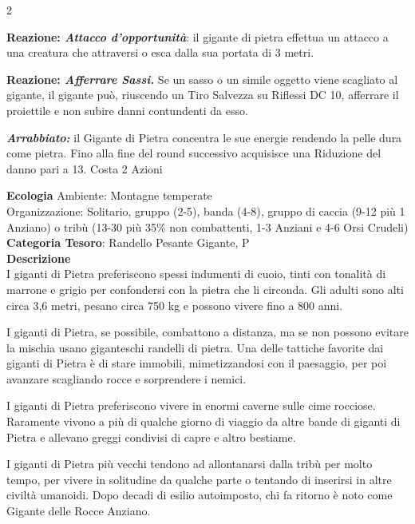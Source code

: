 \begin{multicols}{2}
{\textbf{Reazione: \emph{Attacco d'opportunità}}: il gigante di pietra effettua un attacco a una creatura che attraversi o esca dalla sua portata di 3 metri.

\textbf{Reazione: \emph{Afferrare Sassi.}} Se un sasso o un simile oggetto viene scagliato al gigante, il gigante può, riuscendo un Tiro Salvezza su Riflessi DC 10, afferrare il proiettile e non subire danni contundenti da esso.

\emph{\textbf{Arrabbiato:}} il Gigante di Pietra concentra le sue energie rendendo la pelle dura come pietra. Fino alla fine del round successivo acquisisce una Riduzione del danno pari a 13. Costa 2 Azioni

\textbf{Ecologia}
Ambiente: Montagne temperate\\
Organizzazione: Solitario, gruppo (2-5), banda (4-8), gruppo di caccia (9-12 più 1 Anziano) o tribù (13-30 più 35\% non combattenti, 1-3 Anziani e 4-6 Orsi Crudeli)\\
\textbf{Categoria Tesoro}: Randello Pesante Gigante, P\\
\textbf{Descrizione}\\
I giganti di Pietra preferiscono spessi indumenti di cuoio, tinti con tonalità di marrone e grigio per confondersi con la pietra che li circonda. Gli adulti sono alti circa 3,6 metri, pesano circa 750 kg e possono vivere fino a 800 anni.

I giganti di Pietra, se possibile, combattono a distanza, ma se non possono evitare la mischia usano giganteschi randelli di pietra. Una delle tattiche favorite dai giganti di Pietra è di stare immobili, mimetizzandosi con il paesaggio, per poi avanzare scagliando rocce e sorprendere i nemici.

I giganti di Pietra preferiscono vivere in enormi caverne sulle cime rocciose. Raramente vivono a più di qualche giorno di viaggio da altre bande di giganti di Pietra e allevano greggi condivisi di capre e altro bestiame.

I giganti di Pietra più vecchi tendono ad allontanarsi dalla tribù per molto tempo, per vivere in solitudine da qualche parte o tentando di inserirsi in altre civiltà umanoidi. Dopo decadi di esilio autoimposto, chi fa ritorno è noto come Gigante delle Rocce Anziano.

}
\end{multicols}
